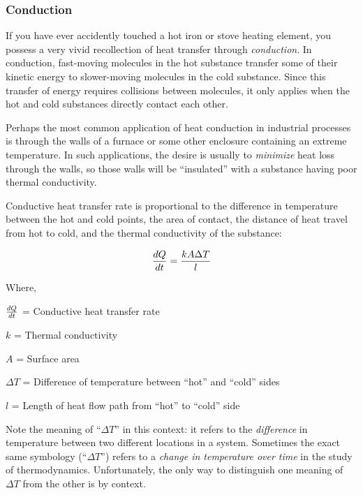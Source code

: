 \filbreak
\subsubsection{Conduction}

If you have ever accidently touched a hot iron or stove heating element, you possess a very vivid recollection of heat transfer through \textit{conduction}.  In conduction, fast-moving molecules in the hot substance transfer some of their kinetic energy to slower-moving molecules in the cold substance.  Since this transfer of energy requires collisions between molecules, it only applies when the hot and cold substances directly contact each other.    

Perhaps the most common application of heat conduction in industrial processes is through the walls of a furnace or some other enclosure containing an extreme temperature.  In such applications, the desire is usually to \textit{minimize} heat loss through the walls, so those walls will be ``insulated'' with a substance having poor thermal conductivity.

\filbreak

Conductive heat transfer rate is proportional to the difference in temperature between the hot and cold points, the area of contact, the distance of heat travel from hot to cold, and the thermal conductivity of the substance:

$${dQ \over dt} = {kA {\Delta T} \over l}$$

\noindent
Where,

$dQ \over dt$ = Conductive heat transfer rate

$k$ = Thermal conductivity 

$A$ = Surface area 

$\Delta T$ = Difference of temperature between ``hot'' and ``cold'' sides

$l$ = Length of heat flow path from ``hot'' to ``cold'' side

\vskip 10pt

Note the meaning of ``$\Delta T$'' in this context: it refers to the \textit{difference} in temperature between two different locations in a system.  Sometimes the exact same symbology (``$\Delta T$'') refers to a \textit{change in temperature over time} in the study of thermodynamics.  Unfortunately, the only way to distinguish one meaning of $\Delta T$ from the other is by context.  

